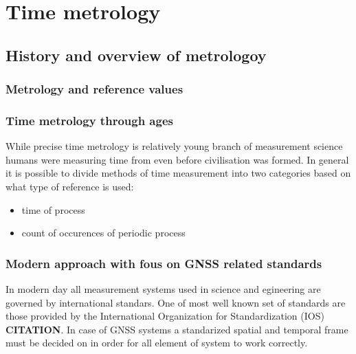\chapter{Time metrology}


\section{History and overview of metrologoy}

\subsection{Metrology and reference values}

\subsection{Time metrology through ages}
While precise time metrology is relatively young branch of measurement science humans were
measuring time from even before civilisation was formed.
In general it is possible to divide methods of time measurement into two categories based on 
what type of reference is used:
\begin{itemize}
	\item time of process
	\item count of occurences of periodic process
\end{itemize}

\subsection{Modern approach with fous on GNSS related standards}
In modern day all measurement systems used in science and egineering are governed by international
standars. One of most well known set of standards are those provided by the International 
Organization for Standardization (IOS) \textbf{CITATION}.
In case of GNSS systems a standarized spatial and temporal frame must be decided on in order
for all element of system to work correctly.

